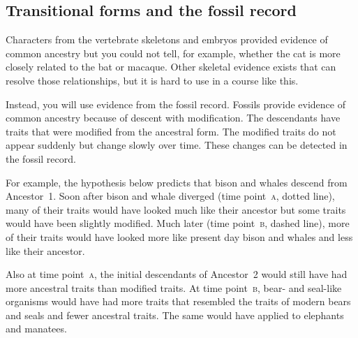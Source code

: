 \documentclass[12pt, hidelinks]{exam}
\begin{document}
\subsection*{Transitional forms and the fossil record}%



%		
%
Characters from the vertebrate skeletons and embryos provided evidence of common 
ancestry but you could not tell, for example, whether the cat is more closely related to the bat or macaque. 
Other skeletal evidence exists
that can resolve those relationships, but it is hard to use in a course like this.

Instead, you will use evidence from the fossil record. Fossils provide evidence of common ancestry because of descent with modification. The descendants have traits that were modified from the ancestral form. The modified traits do not appear suddenly but change slowly over time. These changes can be detected in the fossil record.

For example, the hypothesis below predicts that bison and whales descend from Ancestor~1. Soon after bison and whale diverged (time point~\textsc{a}, dotted line), many of their traits would have looked much like their ancestor but some traits would have been slightly modified. Much later (time point~\textsc{b}, dashed line), more of their traits would have looked more like present day bison and whales and less like their ancestor. 

Also at time point~\textsc{a}, the initial descendants of Ancestor~2 would still have had more ancestral traits than modified traits. At time point~\textsc{b}, bear- and seal-like organisms would have had more traits that resembled the traits of modern bears and seals and fewer ancestral traits. The same would have applied to elephants and manatees.
\end{document}
